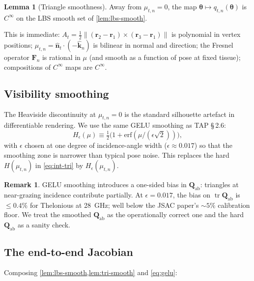 \documentclass[11pt,a4paper]{article}
\theoremstyle{definition}
\newtheorem{lemma}[lemma]{Lemma}
\newtheorem{remark}[remark]{Remark}
\newcommand{\khat}{\hat{\bm{k}}}
\newcommand{\nhat}{\hat{\bm{n}}}
\newcommand{\rr}{\mathbf{r}}
\DeclareMathOperator{\tr}{tr}
\newcommand{\half}{\tfrac{1}{2}}
\newcommand{\Qabs}{\mathbf{Q}_{\mathrm{ab}}}
\newcommand{\thetab}{\bm{\theta}}
\begin{document}
\begin{lemma}[Triangle smoothness]\label{lem:tri-smooth}
Away from $\mu_{t,n}=0$, the map
$\thetab\mapsto q_{t,n}(\thetab)$ is $C^\infty$ on the LBS
smooth set of \cref{lem:lbs-smooth}.
\end{lemma}

\noindent This is immediate: $A_t=\half\|(\rr_2-\rr_1)\times
(\rr_3-\rr_1)\|$ is polynomial in vertex positions; $\mu_{t,n}
=\nhat_t\cdot(-\khat_n)$ is bilinear in normal and direction; the
Fresnel operator $\mathbf{F}_n$ is rational in $\mu$ (and smooth as a
function of pose at fixed tissue); compositions of $C^\infty$ maps
are $C^\infty$.

\subsection{Visibility smoothing}\label{sec:gelu}

The Heaviside discontinuity at $\mu_{t,n}=0$ is the standard
silhouette artefact in differentiable rendering.  We use the same
GELU smoothing as TAP \S\,2.6:
\begin{equation}\label{eq:gelu}
  H_\epsilon(\mu) \equiv \tfrac{1}{2}\bigl(1+\mathrm{erf}(\mu/(\epsilon\sqrt{2}))\bigr),
\end{equation}
with $\epsilon$ chosen at one degree of incidence-angle width
($\epsilon\approx 0.017$) so that the smoothing zone is narrower than
typical pose noise.  This replaces the hard $H(\mu_{t,n})$ in
\eqref{eq:int-tri} by $H_\epsilon(\mu_{t,n})$.

\begin{remark}\label{rem:gelu-bias}
GELU smoothing introduces a one-sided bias in $\Qabs$: triangles at
near-grazing incidence contribute partially.  At
$\epsilon=0.017$, the bias on $\tr\Qabs$ is $\le 0.4\%$ for
Thelonious at \SI{28}{GHz}; well below the JSAC paper's $\sim 5\%$
calibration floor.  We treat the smoothed $\Qabs$ as the
operationally correct one and the hard $\Qabs$ as a sanity check.
\end{remark}

\subsection{The end-to-end Jacobian}

Composing \cref{lem:lbs-smooth,lem:tri-smooth} and \eqref{eq:gelu}:
\end{document}
